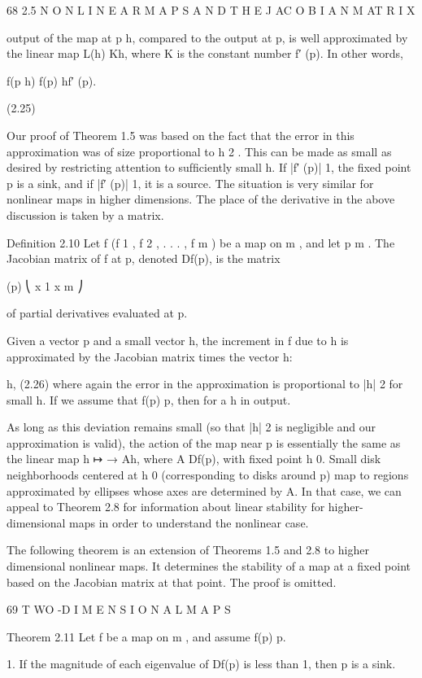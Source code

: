 \documentclass[12pt]{article}
\begin{document}
68 2.5 N O N L I N E A R M A P S A N D T H E J AC O B I A N M AT R I X

output of the map at p  h, compared to the output at p, is well approximated by the linear map L(h)  Kh, where K is the constant 
number f′ (p). In other words,

f(p  h)  f(p)  hf′ (p).

(2.25)

Our proof of Theorem 1.5 was based on the fact that the error in this approximation was of size proportional to h 2 . This can be 
made as small as desired by restricting attention to sufﬁciently small h. If |f′ (p)|  1, the ﬁxed point p is a sink, and if |f′ 
(p)|  1, it is a source. The situation is very similar for nonlinear maps in higher dimensions. The place of the derivative in the 
above discussion is taken by a matrix.

Deﬁnition 2.10 Let f  (f 1 , f 2 , . . . , f m ) be a map on  m , and let p   m . The Jacobian matrix of f at p, denoted Df(p), is 
the matrix

 (p) ⎝  x 1  x m ⎠

of partial derivatives evaluated at p.

Given a vector p and a small vector h, the increment in f due to h is approximated by the Jacobian matrix times the vector h:

 h, (2.26) where again the error in the approximation is proportional to |h| 2 for small h. If we assume that f(p)  p, then for a 
 h in output.

As long as this deviation remains small (so that |h| 2 is negligible and our approximation is valid), the action of the map near p is 
essentially the same as the linear map h ↦ → Ah, where A  Df(p), with ﬁxed point h  0. Small disk neighborhoods centered at h  0 
(corresponding to disks around p) map to regions approximated by ellipses whose axes are determined by A. In that case, we can appeal 
to Theorem 2.8 for information about linear stability for higher-dimensional maps in order to understand the nonlinear case.

The following theorem is an extension of Theorems 1.5 and 2.8 to higher dimensional nonlinear maps. It determines the stability of a 
map at a ﬁxed point based on the Jacobian matrix at that point. The proof is omitted.

69 T WO -D I M E N S I O N A L M A P S

Theorem 2.11 Let f be a map on  m , and assume f(p)  p.

1. If the magnitude of each eigenvalue of Df(p) is less than 1, then p is a sink.
\end{document}
